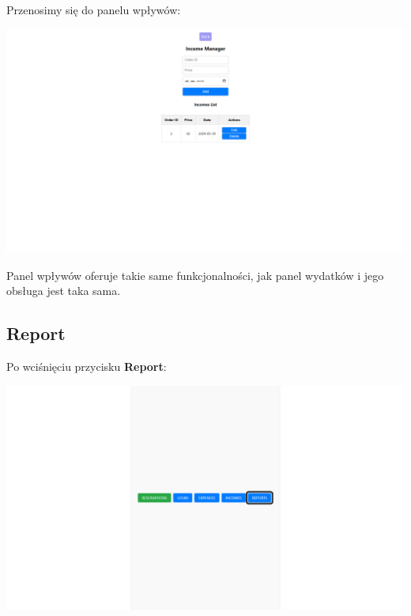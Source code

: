 \documentclass[12pt]{article}
\begin{document}
\begin{minipage}{\textwidth}
\noindent Przenosimy się do panelu wpływów:
\begin{center}
\includegraphics[width=\textwidth]{media/Incomes_in.png}
\end{center}
\end{minipage}

Panel wpływów oferuje takie same funkcjonalności, jak panel wydatków i jego obsługa jest taka sama.

\newpage
\subsection{Report}
\begin{minipage}{\textwidth}
\noindent Po wciśnięciu przycisku \textbf{Report}:
\begin{center}
\includegraphics[width=\textwidth]{media/Reports.png}
\end{center}
\end{minipage}
\end{document}

